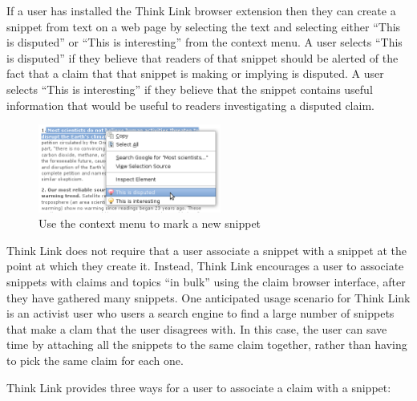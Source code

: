 \documentclass{chi2009}
\begin{document}
If a user has installed the Think Link browser extension then they can create a snippet from text on a web page by selecting the text and selecting either ``This is disputed'' or ``This is interesting'' from the context menu. A user selects ``This is disputed'' if they believe that readers of that snippet should be alerted of the fact that a claim that that snippet is making or implying is disputed. A user selects ``This is interesting'' if they believe that the snippet contains useful information that would be useful to readers investigating a disputed claim. 

\begin{figure}[tb]
	\begin{center}
	\includegraphics[width=6cm]{../screenshots/v2_snipmark.png}
	\caption{Use the context menu to mark a new snippet}
	\label{createprocess}
	\end{center}
\end{figure}

Think Link does not require that a user associate a snippet with a snippet at the point at which they create it. Instead, Think Link encourages a user to associate snippets with claims and topics ``in bulk'' using the claim browser interface, after they have gathered many snippets. One anticipated usage scenario for Think Link is an activist user who users a search engine to find a large number of snippets that make a clam that the user disagrees with. In this case, the user can save time by attaching all the snippets to the same claim together, rather than having to pick the same claim for each one.

Think Link provides three ways for a user to associate a claim with a snippet:
\end{document}
